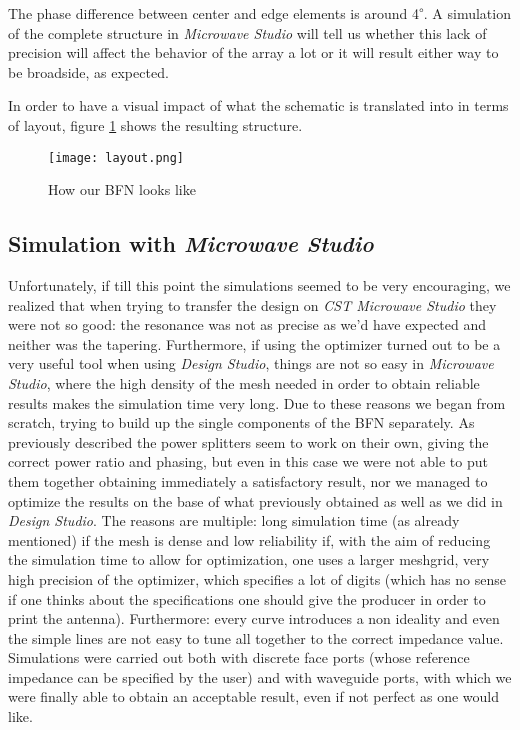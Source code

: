 \par\medskip
\noindent
The phase difference between center and edge elements is around 4\textsuperscript{$\circ$}. A simulation of the complete structure in \textit{Microwave Studio} will tell us whether this lack of precision will affect the behavior of the array a lot or it will result either way to be broadside, as expected.

\par\medskip
\noindent
In order to have a visual impact of what the schematic is translated into in terms of layout, figure \ref{layout} shows the resulting structure.

\begin{figure}[H]
\centering
\texttt{[image: layout.png]}
\caption{How our BFN looks like}
\label{layout}
\end{figure}

\subsection{Simulation with \textit{Microwave Studio}}

Unfortunately, if till this point the simulations seemed to be very encouraging, we realized that when trying to transfer the design on \textit{CST Microwave Studio} they were not so good: the resonance was not as precise as we'd have expected and neither was the tapering. Furthermore, if using the optimizer turned out to be a very useful tool when using \textit{Design Studio}, things are not so easy in \textit{Microwave Studio}, where the high density of the mesh needed in order to obtain reliable results makes the simulation time very long. Due to these reasons we began from scratch, trying to build up the single components of the BFN separately. As previously described the power splitters seem to work on their own, giving the correct power ratio and phasing, but even in this case we were not able to put them together obtaining immediately a satisfactory result, nor we managed to optimize the results on the base of what previously obtained as well as we did in \textit{Design Studio}. The reasons are multiple: long simulation time (as already mentioned) if the mesh is dense and low reliability if, with the aim of reducing the simulation time to allow for optimization, one uses a larger meshgrid, very high precision of the optimizer, which specifies a lot of digits (which has no sense if one thinks about the specifications one should give the producer in order to print the antenna). Furthermore: every curve introduces a non ideality and even the simple lines are not easy to tune all together to the correct impedance value. Simulations were carried out both with discrete face ports (whose reference impedance can be specified by the user) and with waveguide ports, with which we were finally able to obtain an acceptable result, even if not perfect as one would like.
\par\medskip
\noindent

